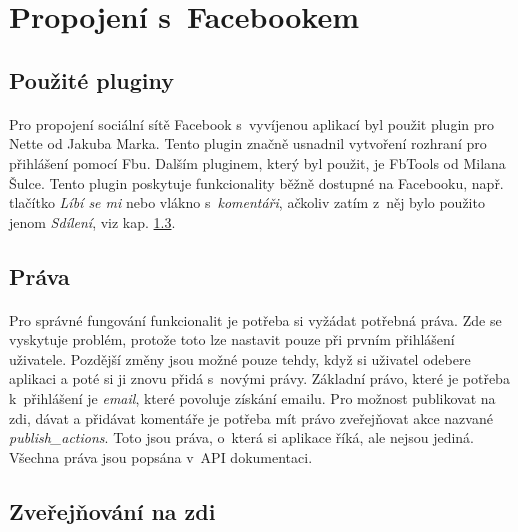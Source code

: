 \documentclass[11pt,a4paper,titlepage,oneside]{book}
\begin{document}
		\section{Propojení s~Facebookem}
			\subsection{Použité pluginy}



				\paragraph{} Pro propojení sociální sítě Facebook s~vyvíjenou aplikací byl použit plugin pro Nette\cite{nette20login} od Jakuba Marka. Tento plugin značně usnadnil vytvoření rozhraní pro přihlášení pomocí \acl{Fb}u. Dalším pluginem, který byl použit, je FbTools\cite{FbTools} od Milana Šulce. Tento plugin poskytuje funkcionality běžně dostupné na Facebooku, např. tlačítko \textit{Líbí se mi} nebo vlákno s~\textit{komentáři}, ačkoliv zatím z~něj bylo použito jenom \textit{Sdílení}, viz kap. \ref{sec:sdileni}.
			\subsection{Práva}
				\paragraph{} Pro správné fungování funkcionalit je potřeba si vyžádat potřebná  práva. Zde se vyskytuje problém, protože toto lze nastavit pouze při prvním přihlá\-šení uživatele. Pozdější změny jsou možné pouze tehdy, když si uživatel odebere aplikaci a poté si ji znovu přidá s~novými právy. Základní právo, které je potřeba k~přihlášení je \textit{email}, které povoluje získání emailu. Pro možnost publikovat na zdi, dávat  a přidávat komentáře je potřeba mít právo zveřejňovat akce nazvané \textit{publish\_actions}. Toto jsou práva, o~která si aplikace říká, ale nejsou jediná. Všechna práva jsou popsána v~API dokumentaci\cite{FbApiPrava}.
			\subsection{Zveřejňování na zdi}
				\label{sec:sdileni}
\end{document}
